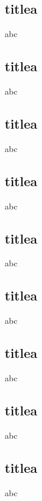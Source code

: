 \documentclass[compress]{beamer}
\begin{document}
\subsection{titlea}
\begin{frame}
    abc
\end{frame} \subsection{titlea}
\begin{frame}
    abc
\end{frame} 
\subsection{titlea}
\begin{frame}
    abc
\end{frame} 
\subsection{titlea}

\begin{frame}
    abc
\end{frame} 
\subsection{titlea}
\begin{frame}
    abc
\end{frame} 
\subsection{titlea}
\begin{frame}
    abc
\end{frame} 
\subsection{titlea}
\begin{frame}
    abc
\end{frame} 
\subsection{titlea}
\begin{frame}
    abc
\end{frame} 
\subsection{titlea}
\begin{frame}
    abc
\end{frame} 
\end{document}
